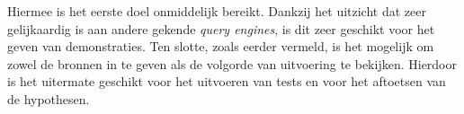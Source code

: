 Hiermee is het eerste doel onmiddelijk bereikt. Dankzij het uitzicht dat zeer gelijkaardig is aan andere gekende \textit{query engines}, is dit zeer geschikt voor het geven van demonstraties. Ten slotte, zoals eerder vermeld, is het mogelijk om zowel de bronnen in te geven als de volgorde van uitvoering te bekijken. Hierdoor is het uitermate geschikt voor het uitvoeren van tests en voor het aftoetsen van de hypothesen.